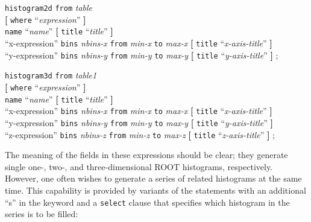 \documentclass[12pt]{article}
\begin{document}
\begin{flushleft}
{\tt histogram2d} {\tt from} {\em table} \\
\hspace{1cm}  {\bf[} {\tt where} ``{\em expression}'' {\bf]} \\
\hspace{1cm}  {\tt name} ``{\em name}'' {\bf[} {\tt title} ``{\em title}'' {\bf]} \\
\hspace{1cm} ``x-expression'' {\tt bins} {\em nbins-x} {\tt from} {\em min-x} {\tt to} {\em max-x} {\bf[} {\tt title}  ``{\em x-axis-title}'' {\bf]} \\
\hspace{1cm}  ``y-expression'' {\tt bins} {\em nbins-y} {\tt from} {\em min-y} {\tt to} {\em max-y} {\bf[} {\tt title}  ``{\em y-axis-title}'' {\bf]} ;
\end{flushleft}
\vspace{5mm}


\begin{flushleft}
{\tt histogram3d} {\tt from} {\em table1} \\
\hspace{1cm}  {\bf[} {\tt where} ``{\em expression}'' {\bf]} \\
\hspace{1cm}  {\tt name} ``{\em name}'' {\bf[} {\tt title} ``{\em title}'' {\bf]} \\
\hspace{1cm}  ``x-expression'' {\tt bins} {\em nbins-x} {\tt from} {\em min-x} {\tt to} {\em max-x} {\bf[} {\tt title}  ``{\em x-axis-title}'' {\bf]} \\
\hspace{1cm}  ``y-expression'' {\tt bins} {\em nbins-y} {\tt from} {\em min-y} {\tt to} {\em max-y} {\bf[} {\tt title}  ``{\em y-axis-title}'' {\bf]} \\
\hspace{1cm}  ``z-expression'' {\tt bins} {\em nbins-z} {\tt from} {\em min-z} {\tt to} {\em max-z} {\bf[} {\tt title}  ``{\em z-axis-title}'' {\bf]} ;
\end{flushleft}
\vspace{5mm}

The meaning of the fields in these expressions should be clear; they generate
single one-, two-, and three-dimensional ROOT histograms, respectively.  
However, one often wishes to generate a series of related histograms
at the same time.  This capability is provided by variants of the statements
with an additional ``s'' in the keyword and a {\tt select} clause that
specifies which histogram in the series is to be filled:
\end{document}
